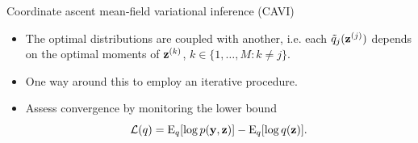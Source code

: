 \begin{frame}[label=cavi]{Coordinate ascent mean-field variational inference (CAVI)}
  \vspace{-5pt}
  \begin{itemize}\setlength\itemsep{0.4em}
    \item The optimal distributions are coupled with another, i.e. each $\tilde q_j({\mathbf z}^{(j)})$ depends on the optimal moments of ${\mathbf z}^{(k)}$, $k \in \{1,\dots,M:k \neq j\}$.
    \item One way around this to employ an iterative procedure.
    \item Assess convergence by monitoring the lower bound
    \[
      {\mathcal L}(q) = \operatorname{E}_{ q}[\log p({\mathbf y}, {\mathbf z})] - \operatorname{E}_{ q}[\log q({\mathbf z})].
    \]
  \end{itemize}
  \vspace{-12pt}
    \begin{center}
  \end{center}
%  
\end{frame}
